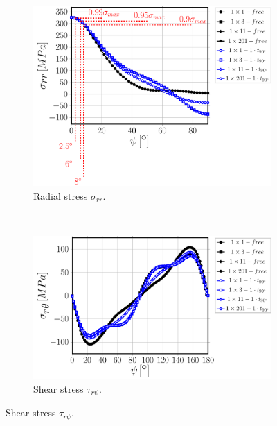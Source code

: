 \begin{figure}[!hp]
\centering
    \begin{subfigure}[b]{0.475\textwidth}
        \includegraphics[width=\textwidth]{paperE/vf60-nodamage-sigmar.pdf}
        \caption{Radial stress $\sigma_{rr}$.}\label{paperE:fig:stress-a}
    \end{subfigure} ~
    \begin{subfigure}[b]{0.475\textwidth}
        \includegraphics[width=\textwidth]{paperE/vf60-nodamage-taurt.pdf}
        \caption{Shear stress $\tau_{r\psi}$.}\label{paperE:fig:stress-b}
    \end{subfigure}


\end{figure}
